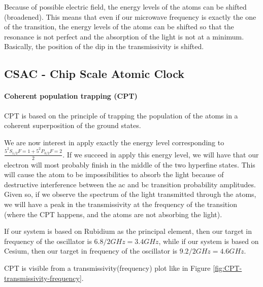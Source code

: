 Because of possible electric field, the energy levels of the atoms can be shifted (broadened).
This means that even if our microwave frequency is exactly the one of the transition, the energy levels of the atoms can be shifted so that the resonance is not perfect and the absorption of the light is not at a minimum.
Basically, the position of the dip in the transmissivity is shifted.

\subsection{CSAC - Chip Scale Atomic Clock}

\paragraph{Coherent population trapping (CPT)}

CPT is based on the principle of trapping the population of the atoms in a coherent superposition of the ground states.

We are now interest in apply exactly the energy level corresponding to $\frac{5^2S_{1/2} F=1 + 5^2P_{3/2} F=2}{2}$.
If we succeed in apply this energy level, we will have that our electron will most probably finish in the middle of the two hyperfine states.
This will cause the atom to be impossibilities to absorb the light because of destructive interference between the ac and bc transition probability amplitudes.
Given so, if we observe the spectrum of the light transmitted through the atoms, we will have a peak in the transmissivity at the frequency of the transition (where the CPT happens, and the atoms are not absorbing the light).

If our system is based on Rubidium as the principal element, then our target in frequency of the oscillator is $6.8/2 GHz = 3.4 GHz$, while if our system is based on Cesium, then our target in frequency of the oscillator is $9.2/2 GHz = 4.6 GHz$.

CPT is visible from a transmissivity(frequency) plot like in Figure \ref{fig:CPT-transmissivity-frequency}.

